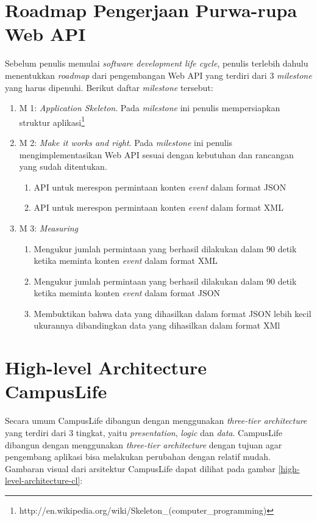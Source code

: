 \documentclass[a4paper, 12pt, oneside]{report}
\begin{document}
\section{Roadmap Pengerjaan Purwa-rupa Web API}
\onehalfspacing Sebelum penulis memulai \textit{software development life cycle}, penulis terlebih dahulu menentukkan \textit{roadmap} dari pengembangan Web API yang terdiri dari 3 \textit{milestone} yang harus dipenuhi. Berikut daftar \textit{milestone} tersebut:
\begin{enumerate}
  \item M 1: \textit{Application Skeleton}. Pada \textit{milestone} ini penulis mempersiapkan struktur aplikasi\footnote{http://en.wikipedia.org/wiki/Skeleton\_(computer\_programming)}
  \item M 2: \textit{Make it works and right}. Pada \textit{milestone} ini penulis mengimplementasikan Web API sesuai dengan kebutuhan dan rancangan yang sudah ditentukan.
  \begin{enumerate}
    \item API untuk merespon permintaan konten \textit{event} dalam format JSON
    \item API untuk merespon permintaan konten \textit{event} dalam format XML
  \end{enumerate}
  \item M 3: \textit{Measuring}
    \begin{enumerate}
      \item Mengukur jumlah permintaan yang berhasil dilakukan dalam 90 detik ketika meminta konten \textit{event} dalam format XML
      \item Mengukur jumlah permintaan yang berhasil dilakukan dalam 90 detik ketika meminta konten \textit{event} dalam format JSON
      \item Membuktikan bahwa data yang dihasilkan dalam format JSON lebih kecil ukurannya dibandingkan data yang dihasilkan dalam format XMl
    \end{enumerate}
\end{enumerate}

\section{High-level Architecture CampusLife}
\onehalfspacing Secara umum CampusLife dibangun dengan menggunakan \textit{three-tier architecture} yang terdiri dari 3 tingkat, yaitu \textit{presentation}, \textit{logic} dan \textit{data}. CampusLife dibangun dengan menggunakan \textit{three-tier architecture} dengan tujuan agar pengembang aplikasi bisa melakukan perubahan dengan relatif mudah. Gambaran visual dari arsitektur CampusLife dapat dilihat pada gambar \ref{high-level-architecture-cl}:
\end{document}
